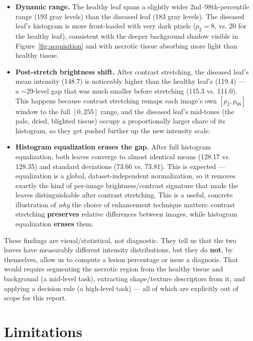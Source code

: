 \documentclass[11pt,a4paper]{article}
\begin{document}
\begin{itemize}
    \item \textbf{Dynamic range.} The healthy leaf spans a slightly wider 2nd--98th-percentile range (193 gray levels) than the diseased leaf (183 gray levels). The diseased leaf's histogram is more front-loaded with very dark pixels ($p_2=8$, vs. $20$ for the healthy leaf), consistent with the deeper background shadow visible in Figure~\ref{fig:acquisition} and with necrotic tissue absorbing more light than healthy tissue.
    \item \textbf{Post-stretch brightness shift.} After contrast stretching, the diseased leaf's mean intensity (148.7) is noticeably higher than the healthy leaf's (119.4) --- a $\sim$29-level gap that was much smaller before stretching (115.3 vs. 111.0). This happens because contrast stretching remaps each image's own $[p_2,p_{98}]$ window to the full $[0,255]$ range, and the diseased leaf's mid-tones (the pale, dried, blighted tissue) occupy a proportionally larger share of its histogram, so they get pushed further up the new intensity scale.
    \item \textbf{Histogram equalization erases the gap.} After full histogram equalization, both leaves converge to almost identical means (128.17 vs. 128.35) and standard deviations (73.66 vs. 73.81). This is expected --- equalization is a global, dataset-independent normalization, so it removes exactly the kind of per-image brightness/contrast signature that made the leaves distinguishable after contrast stretching. This is a useful, concrete illustration of \textit{why} the choice of enhancement technique matters: contrast stretching \textbf{preserves} relative differences between images, while histogram equalization \textbf{erases} them.
\end{itemize}

These findings are visual/statistical, not diagnostic. They tell us that the two leaves have measurably different intensity distributions, but they do \textbf{not}, by themselves, allow us to compute a lesion percentage or issue a diagnosis. That would require segmenting the necrotic region from the healthy tissue and background (a mid-level task), extracting shape/texture descriptors from it, and applying a decision rule (a high-level task) --- all of which are explicitly out of scope for this report.

\section{Limitations}
\end{document}
